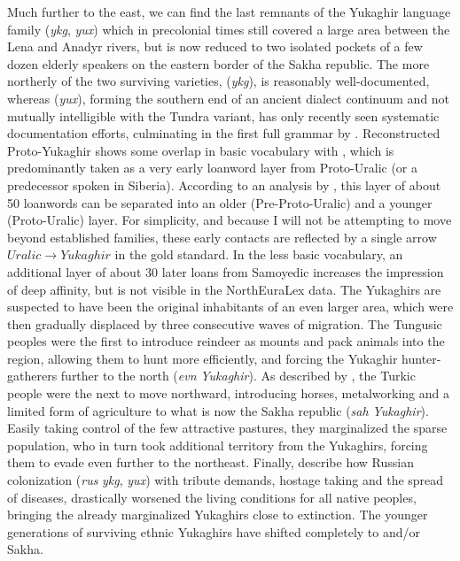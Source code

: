 Much further to the east, we can find the last remnants of the Yukaghir language family (\textit{ykg}, \textit{yux}) which in precolonial times still covered a large area between the Lena and Anadyr rivers, but is now reduced to two isolated pockets of a few dozen elderly speakers on the eastern border of the Sakha republic. The more northerly of the two surviving varieties,  (\textit{ykg}), is reasonably well-documented, whereas  (\textit{yux}), forming the southern end of an ancient dialect continuum and not mutually intelligible with the Tundra variant, has only recently seen systematic documentation efforts, culminating in the first full grammar by \cite{maslova2003}. Reconstructed Proto-Yukaghir shows some overlap in basic vocabulary with , which is predominantly taken as a very early loanword layer from Proto-Uralic (or a predecessor spoken in Siberia). According to an analysis by \cite{hakkinen2012}, this layer of 
about 50 loanwords can be separated into an older (Pre-Proto-Uralic) and a younger (Proto-Uralic) layer. For simplicity, and because I will not be attempting to move beyond established families, these early contacts are reflected by a single arrow $Uralic \rightarrow Yukaghir$ in the gold standard. In the less basic vocabulary, an additional layer of about 30 later loans from Samoyedic increases the impression of deep affinity, but is not visible in the NorthEuraLex data. The Yukaghirs are suspected to have been the original inhabitants of an even larger area, which were then gradually displaced by three consecutive waves of migration. The Tungusic peoples were the first to introduce reindeer as mounts and pack animals into the region, allowing them to hunt more efficiently, and forcing the Yukaghir hunter-gatherers further to the north (\textit{evn} \arrowLA \textit{Yukaghir}). As described by \cite[p. 52]{menges1995}, the Turkic  people were the next to move northward, 
introducing horses, metalworking and a limited form of agriculture to what is now the Sakha republic (\textit{sah} \arrowLA \textit{Yukaghir}). Easily taking control of the few attractive pastures, they marginalized the sparse  population, who in turn took additional territory from the Yukaghirs, forcing them to evade even further to the northeast. Finally, \cite{viires_vahtre_1993} describe how Russian colonization (\textit{rus} \arrowLA \textit{ykg}, \textit{yux}) with tribute demands, hostage taking and the spread of diseases, drastically worsened the living conditions for all native peoples, bringing the already marginalized Yukaghirs close to extinction. The younger generations of surviving ethnic Yukaghirs have shifted completely to  and/or Sakha.


